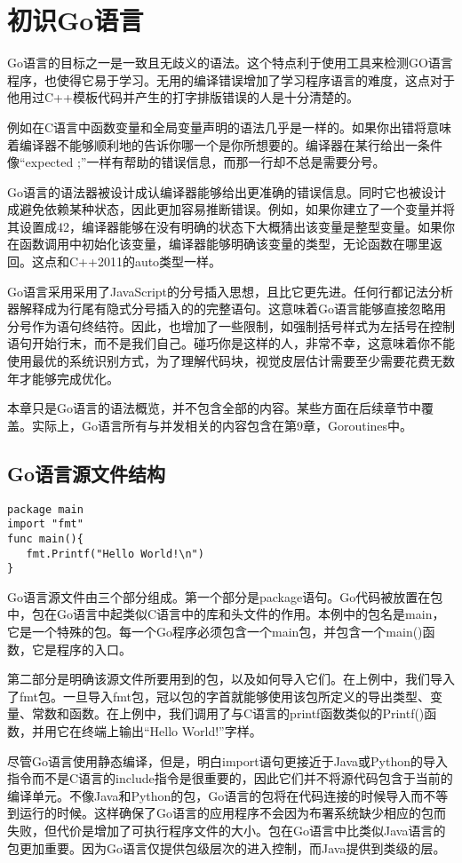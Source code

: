 \chapter{初识Go语言}
Go语言的目标之一是一致且无歧义的语法。这个特点利于使用工具来检测GO语言程序，也使得它易于学习。无用的编译错误增加了学习程序语言的难度，这点对于他用过C++模板代码并产生的打字排版错误的人是十分清楚的。

例如在C语言中函数变量和全局变量声明的语法几乎是一样的。如果你出错将意味着编译器不能够顺利地的告诉你哪一个是你所想要的。编译器在某行给出一条件像“expected ;”一样有帮助的错误信息，而那一行却不总是需要分号。

Go语言的语法器被设计成认编译器能够给出更准确的错误信息。同时它也被设计成避免依赖某种状态，因此更加容易推断错误。例如，如果你建立了一个变量并将其设置成42，编译器能够在没有明确的状态下大概猜出该变量是整型变量。如果你在函数调用中初始化该变量，编译器能够明确该变量的类型，无论函数在哪里返回。这点和C++2011的auto类型一样。

Go语言采用采用了JavaScript的分号插入思想，且比它更先进。任何行都记法分析器解释成为行尾有隐式分号插入的的完整语句。这意味着Go语言能够直接忽略用分号作为语句终结符。因此，也增加了一些限制，如强制括号样式为左括号在控制语句开始行末，而不是我们自己。碰巧你是这样的人，非常不幸，这意味着你不能使用最优的系统识别方式，为了理解代码块，视觉皮层估计需要至少需要花费无数年才能够完成优化。

本章只是Go语言的语法概览，并不包含全部的内容。某些方面在后续章节中覆盖。实际上，Go语言所有与并发相关的内容包含在第9章，Goroutines中。

\section{Go语言源文件结构}
\begin{lstlisting}
package main
import "fmt"
func main(){
   fmt.Printf("Hello World!\n")
}
\end{lstlisting}

Go语言源文件由三个部分组成。第一个部分是package语句。Go代码被放置在包中，包在Go语言中起类似C语言中的库和头文件的作用。本例中的包名是main，它是一个特殊的包。每一个Go程序必须包含一个main包，并包含一个main()函数，它是程序的入口。

第二部分是明确该源文件所要用到的包，以及如何导入它们。在上例中，我们导入了fmt包。一旦导入fmt包，冠以包的字首就能够使用该包所定义的导出类型、变量、常数和函数。在上例中，我们调用了与C语言的printf函数类似的Printf()函数，并用它在终端上输出“Hello World!”字样。

尽管Go语言使用静态编译，但是，明白import语句更接近于Java或Python的导入指令而不是C语言的include指令是很重要的，因此它们并不将源代码包含于当前的编译单元。不像Java和Python的包，Go语言的包将在代码连接的时候导入而不等到运行的时候。这样确保了Go语言的应用程序不会因为布署系统缺少相应的包而失败，但代价是增加了可执行程序文件的大小。包在Go语言中比类似Java语言的包更加重要。因为Go语言仅提供包级层次的进入控制，而Java提供到类级的层。

